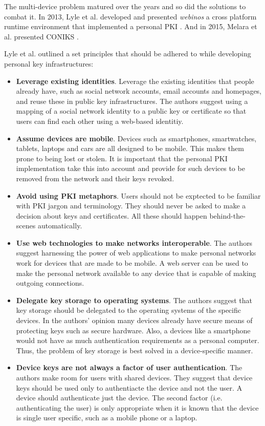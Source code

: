 The multi-device problem matured over the years and so did the solutions to combat it. In 2013, Lyle et al. developed and presented \textit{webinos} a cross platform runtime environment that implemented a personal PKI \cite{Lyle2013}. And in 2015, Melara et al. presented CONIKS  \cite{Melara2015}.

Lyle et al.\cite{Lyle2013} outlined a set principles that should be adhered to while developing personal key infrastructures:
\begin{itemize}

	\item \textbf{Leverage existing identities}. Leverage the existing identities that people already have, such as social network accounts, email 			accounts and homepages, and reuse these in public key infrastructures. The authors suggest using a mapping of a social network identity to a 		public key or certificate so that users can find each other using a web-based identitiy.

	\item \textbf{Assume devices are mobile}. Devices such as smartphones, smartwatches, tablets, laptops and cars are all designed to be 					mobile. This makes them prone to being lost or stolen. It is important that the personal PKI implementation take this into account and provide 		for such devices to be removed from the network and their keys revoked.
	
	\item \textbf{Avoid using PKI metaphors}. Users should not be exptected to be familiar with PKI jargon and terminology. They should never be 		asked to make a decision about keys and certificates. All these should happen behind-the-scenes automatically.
	
	\item \textbf{Use web technologies to make networks interoperable}. The authors suggest harnessing the power of web applications to make 		personal networks work for devices that are made to be mobile. A web server can be used to make the personal network available to any 				device that is capable of making outgoing connections.
	
	\item \textbf{Delegate key storage to operating systems}. The authors suggest that key storage should be delegated to the operating 					systems of the specific devices. In the authors' opinion many devices already have secure means of protecting keys such as secure hardware. 			Also, a devices like a smartphone would not have as much authentication requirements as a personal computer. Thus, the problem of key 				storage is best solved in a device-specific manner.
	
	\item \textbf{Device keys are not always a factor of user authentication}. The authors make room for users with shared devices. They suggest 	that device keys should be used only to authentiacte the device and not the user. A device should authenticate just the device. The second 			factor (i.e. authenticating the user) is only appropriate when it is known that the device is single user specific, such as a mobile phone or a 				laptop.
\end{itemize}

